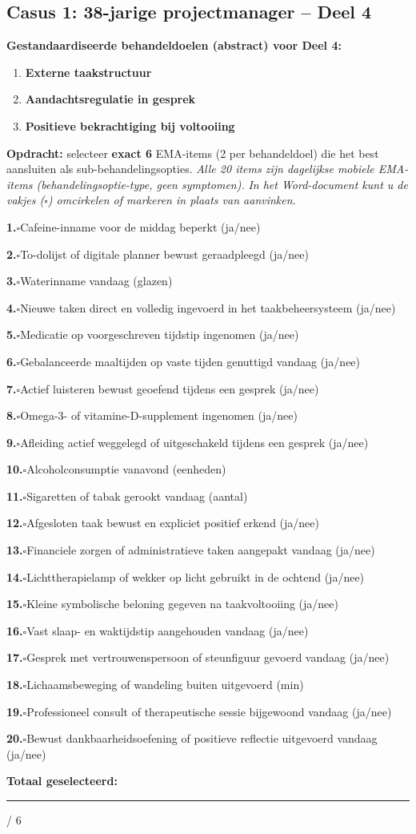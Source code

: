 \documentclass[11pt,a4paper]{article}
\newcommand{\checkitemBFS}[2]{%
\noindent\small\textbf{#1.}\hspace{0.45em}$\square$\hspace{0.4em}#2\par\vspace{0.20em}}
\begin{document}
\newpage
\subsection*{Casus 1: 38-jarige projectmanager -- Deel 4}

\begin{contextbox}
\small\textbf{Gestandaardiseerde behandeldoelen (abstract) voor Deel 4:}
\begin{enumerate}[topsep=2pt,itemsep=1pt,label=\arabic*.]
\item \textbf{Externe taakstructuur}
\item \textbf{Aandachtsregulatie in gesprek}
\item \textbf{Positieve bekrachtiging bij voltooiing}
\end{enumerate}
\end{contextbox}

\begin{responsebox}[title={Uw antwoord -- Deel 4}]
\small\textbf{Opdracht:} selecteer \textbf{exact 6} EMA-items (2 per behandeldoel) die het best aansluiten als sub-behandelingsopties.
\textit{Alle 20 items zijn dagelijkse mobiele EMA-items (behandelingsoptie-type, geen symptomen).}
\textit{In het Word-document kunt u de vakjes ($\square$) omcirkelen of markeren in plaats van aanvinken.}

\checkitemBFS{1}{Cafeine-inname voor de middag beperkt (ja/nee)}
\checkitemBFS{2}{To-dolijst of digitale planner bewust geraadpleegd (ja/nee)}
\checkitemBFS{3}{Waterinname vandaag (glazen)}
\checkitemBFS{4}{Nieuwe taken direct en volledig ingevoerd in het taakbeheersysteem (ja/nee)}
\checkitemBFS{5}{Medicatie op voorgeschreven tijdstip ingenomen (ja/nee)}
\checkitemBFS{6}{Gebalanceerde maaltijden op vaste tijden genuttigd vandaag (ja/nee)}
\checkitemBFS{7}{Actief luisteren bewust geoefend tijdens een gesprek (ja/nee)}
\checkitemBFS{8}{Omega-3- of vitamine-D-supplement ingenomen (ja/nee)}
\checkitemBFS{9}{Afleiding actief weggelegd of uitgeschakeld tijdens een gesprek (ja/nee)}
\checkitemBFS{10}{Alcoholconsumptie vanavond (eenheden)}
\checkitemBFS{11}{Sigaretten of tabak gerookt vandaag (aantal)}
\checkitemBFS{12}{Afgesloten taak bewust en expliciet positief erkend (ja/nee)}
\checkitemBFS{13}{Financiele zorgen of administratieve taken aangepakt vandaag (ja/nee)}
\checkitemBFS{14}{Lichttherapielamp of wekker op licht gebruikt in de ochtend (ja/nee)}
\checkitemBFS{15}{Kleine symbolische beloning gegeven na taakvoltooiing (ja/nee)}
\checkitemBFS{16}{Vast slaap- en waktijdstip aangehouden vandaag (ja/nee)}
\checkitemBFS{17}{Gesprek met vertrouwenspersoon of steunfiguur gevoerd vandaag (ja/nee)}
\checkitemBFS{18}{Lichaamsbeweging of wandeling buiten uitgevoerd (min)}
\checkitemBFS{19}{Professioneel consult of therapeutische sessie bijgewoond vandaag (ja/nee)}
\checkitemBFS{20}{Bewust dankbaarheidsoefening of positieve reflectie uitgevoerd vandaag (ja/nee)}
\vspace{0.4em}
\noindent\textbf{Totaal geselecteerd:}\hspace{0.5em}\rule{1.2cm}{0.25pt}\hspace{0.2em}/ 6
\end{responsebox}
\end{document}
